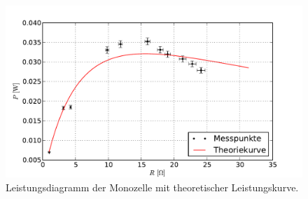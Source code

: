 		\begin{figure}[h]
			\centering
			\includegraphics[width = 15cm]{img/graph_monozelle_leistung.pdf}
			\caption{Leistungsdiagramm der Monozelle mit theoretischer Leistungskurve. \label{fig:graph_monozelle_leistung}}
		\end{figure}